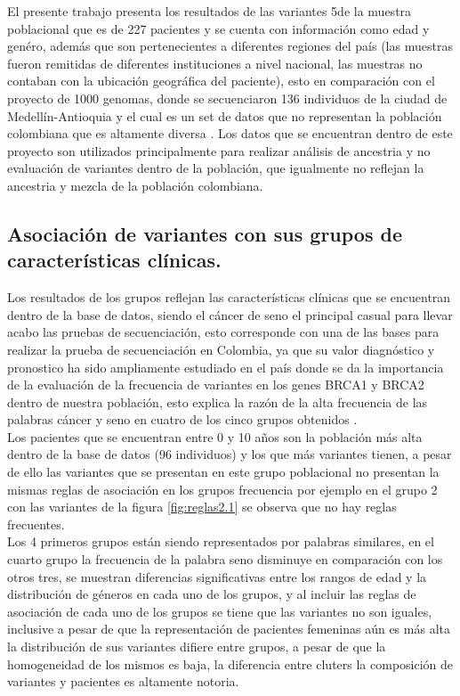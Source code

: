 El presente trabajo presenta los resultados de las variantes 5de la muestra poblacional que es de 227 pacientes y se cuenta con información como edad y genéro, además que son pertenecientes a diferentes regiones del país (las muestras fueron remitidas de diferentes instituciones a nivel nacional, las muestras no contaban con la ubicación geográfica del paciente), esto en comparación con el proyecto de 1000 genomas, donde se secuenciaron 136 individuos de la ciudad de Medellín-Antioquia y el cual es un set de datos que no representan la población colombiana que es altamente diversa \cite{GabrielBedoya, Consortium2012}. Los datos que se encuentran dentro de este proyecto son utilizados principalmente para realizar análisis de ancestria \cite{Rishishwar2015a} y no evaluación de variantes dentro de la población, que igualmente no reflejan la ancestria y mezcla de la población colombiana. 

\subsection{Asociación de variantes con sus grupos de características clínicas. }

Los resultados de los grupos reflejan las características clínicas que se encuentran dentro de la base de datos, siendo el cáncer de seno el principal casual para llevar acabo las pruebas de secuenciación, esto corresponde con una de las bases para realizar la prueba de secuenciación en Colombia, ya que su valor diagnóstico y pronostico ha sido ampliamente estudiado en el país donde se da la importancia de la evaluación de la frecuencia de variantes en los genes BRCA1 y BRCA2 dentro de nuestra población, esto explica la razón de la alta frecuencia de las palabras cáncer y seno en cuatro de los cinco grupos obtenidos \cite{Ignacio2017, Arias-blanco2015}. \\

Los pacientes que se encuentran entre 0 y 10 años son la población más alta dentro de la base de datos (96 individuos)  y los que más variantes tienen, a pesar de ello las variantes que se presentan en este grupo poblacional no presentan la mismas reglas de asociación en los grupos frecuencia por ejemplo en el grupo 2 con las variantes de la figura \ref{fig:reglas2.1} se observa que no hay reglas frecuentes. \\ 

Los 4 primeros grupos están siendo representados por palabras similares, en el cuarto grupo la frecuencia de la palabra seno disminuye en comparación con los otros tres, se muestran diferencias significativas entre los rangos de edad y la distribución de géneros en cada uno de los grupos, y al incluir las reglas de asociación de cada uno de los grupos se tiene que las variantes no son iguales, inclusive a pesar de que la representación de pacientes femeninas aún es más alta la distribución de sus variantes difiere entre grupos, a pesar de que la homogeneidad de los mismos es baja, la diferencia entre cluters la composición de variantes y pacientes es altamente notoria. \\  

